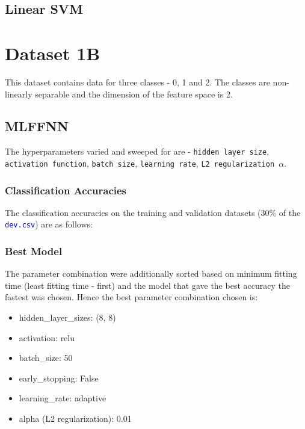 \documentclass[11pt,a4paper]{article}
\def\tt#1{\texttt{#1}}
\def\colortt#1{\textcolor{blue}{\texttt{#1}}}
\begin{document}
\subsection{Linear SVM}

\break
\section{Dataset 1B}
This dataset contains data for three classes - 0, 1 and 2. The classes are non-linearly separable and the dimension of the feature space is 2.
\subsection{MLFFNN}
The hyperparameters varied and sweeped for are - \tt{hidden layer size}, \tt{activation function}, \tt{batch size}, \tt{learning rate}, \tt{L2 regularization $\alpha$}.

\subsubsection{Classification Accuracies}
The classification accuracies on the training and validation datasets (30\% of the \colortt{dev.csv}) are as follows:


\subsubsection{Best Model}
The parameter combination were additionally sorted based on minimum fitting time (least fitting time - first) and the model that gave the best accuracy the fastest was chosen. Hence the best parameter combination chosen is:
\begin{itemize}
    \itemsep0em
    \item hidden\_layer\_sizes: (8, 8)
    \item activation: relu
    \item batch\_size: 50
    \item early\_stopping: False
    \item learning\_rate: adaptive
    \item alpha (L2 regularization): 0.01
\end{itemize}
\end{document}
